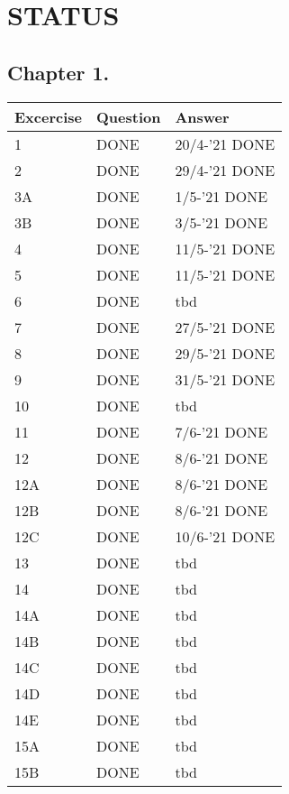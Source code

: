 \section{STATUS}

\subsection*{Chapter 1.}

    \begin{tabular}{|l|l|l|}
        \hline
        \rowcolor[HTML]{EFEFEF}
        {\color[HTML]{000000} Excercise } & {\color[HTML]{000000} Question } & {\color[HTML]{000000} Answer } \\ \hline
        1 & DONE & 20/4-'21 DONE \\ \hline
        2 & DONE & 29/4-'21 DONE \\ \hline
        3A & DONE & 1/5-'21 DONE \\ \hline
        3B & DONE & 3/5-'21 DONE \\ \hline
        4 & DONE & 11/5-'21 DONE \\ \hline
        5 & DONE & 11/5-'21 DONE \\ \hline
        6 & DONE & tbd \\ \hline
        7 & DONE & 27/5-'21 DONE \\ \hline
        8 & DONE & 29/5-'21 DONE \\ \hline
        9 & DONE & 31/5-'21 DONE \\ \hline
        10 & DONE & tbd \\ \hline
        11 & DONE & 7/6-'21 DONE \\ \hline
        12 & DONE & 8/6-'21 DONE \\ \hline
        12A & DONE & 8/6-'21 DONE \\ \hline
        12B & DONE & 8/6-'21 DONE \\ \hline
        12C & DONE & 10/6-'21 DONE \\ \hline
        13 & DONE & tbd \\ \hline
        14 & DONE & tbd \\ \hline
        14A & DONE & tbd \\ \hline
        14B & DONE & tbd \\ \hline
        14C & DONE & tbd \\ \hline
        14D & DONE & tbd \\ \hline
        14E & DONE & tbd \\ \hline
        15A & DONE & tbd \\ \hline
        15B & DONE & tbd \\ \hline
    \end{tabular}


